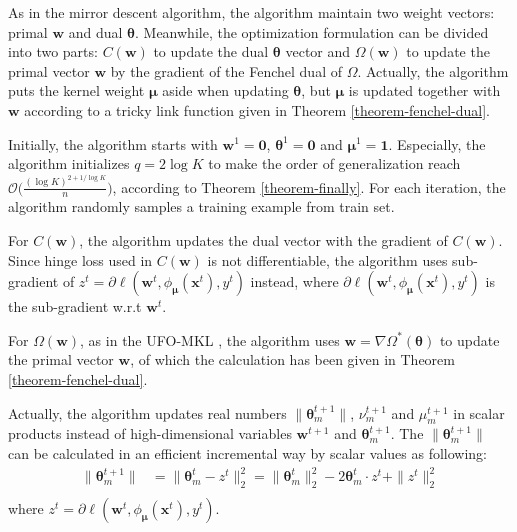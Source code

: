 \documentclass{article}
\begin{document}
 As in the mirror descent algorithm, the algorithm maintain two weight vectors: primal $\mathbf w$ and dual $\pmb{\theta}$.
 Meanwhile, the optimization formulation can be divided into two parts: $C(\mathbf w)$
 to update the dual $\pmb{\theta}$ vector and $\Omega(\mathbf w)$ to update the primal vector $\mathbf w$ by
 the gradient of the Fenchel dual of $\Omega$.
 Actually, the algorithm puts the kernel weight $\pmb{\mu}$ aside when updating $\pmb{\theta}$,
 but $\pmb{\mu}$ is updated together with $\mathbf w$ according to a tricky link function given in Theorem \ref{theorem-fenchel-dual}.

Initially, the algorithm starts with $\mathbf{w}^1=\mathbf{0}$, $\pmb{\theta}^1=\mathbf{0}$ and $\pmb{\mu}^1=\mathbf{1}$.
Especially, the algorithm initializes $q=2\log K$ to make the order of generalization reach
$\mathcal{O}\big(\frac{(\log K)^{2+1/\log K}}{n}\big)$, according to Theorem \ref{theorem-finally}.
For each iteration, the algorithm randomly samples a training example from train set.

For $C(\mathbf w)$, the algorithm updates the dual vector with the gradient of $C(\mathbf w)$.
Since hinge loss used in $C(\mathbf w)$ is not differentiable,
the algorithm uses sub-gradient of $z^t=\partial\ell(\mathbf w^t,\phi_{\bm \mu}(\mathbf{x}^t), y^t)$ instead,
where $\partial\ell(\mathbf w^t,\phi_{\bm \mu}(\mathbf{x}^t), y^t)$ is the sub-gradient w.r.t $\mathbf w^t$.

For $\Omega(\mathbf w)$, as in the UFO-MKL \cite{OrabonaL11},
the algorithm uses $\mathbf w=\nabla\Omega^\ast(\pmb{\theta})$ to update the primal vector $\mathbf w$,
of which the calculation has been given in Theorem \ref{theorem-fenchel-dual}.

Actually, the algorithm updates real numbers $\|\bm \theta_m^{t+1}\|$, $\nu_m^{t+1}$ and $\mu_m^{t+1}$ in scalar products instead of
high-dimensional variables $\mathbf w^{t+1}$ and $\bm \theta_m^{t+1}$.
The $\|\bm \theta_m^{t+1}\|$ can be calculated in an efficient incremental way by scalar values as following:
\begin{align*}
\|\pmb{\theta}_m^{t+1}\|
&=\|\pmb{\theta}_m^{t}-z^t\|_2^2
=\|\pmb{\theta}_m^{t}\|_2^2-2\pmb{\theta}_m^t \cdot z^t +\|z^t\|_2^2\\
\end{align*}
where $z^t=\partial\ell(\mathbf w^t,\phi_{\bm \mu}(\mathbf{x}^t), y^t)$.
\end{document}
